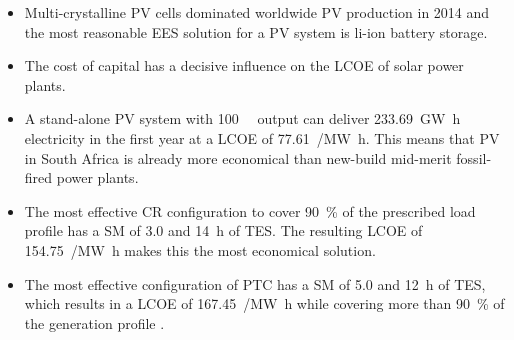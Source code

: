 \begin{itemize}
\item Multi-crystalline \ac{PV} cells dominated worldwide \ac{PV} production in 2014 and the most reasonable \ac{EES} solution for a PV system is \ac{li-ion} battery storage.

\item The cost of capital has a decisive influence on the \ac{LCOE} of solar power plants.


\item A stand-alone \ac{PV} system with \SI{100}{\mega\wattsac} output can deliver \SI{233.69}{\giga\watt\hour} electricity in the first year at a \ac{LCOE} of \SI{77.61}{\usd/\mega\watt\hour}. This means that \ac{PV} in South Africa is already more economical than new-build mid-merit fossil-fired power plants.


\item The most effective \ac{CR} configuration to cover \SI{90}{\percent} of the prescribed load profile has a \ac{SM} of \num{3.0} and \SI{14}{\hour} of \ac{TES}. The resulting \ac{LCOE} of \SI{154.75}{\usd/\mega\watt\hour} makes this the most economical solution.


\item The most effective configuration of \ac{PTC} has a \ac{SM} of \num{5.0} and \SI{12}{\hour} of \ac{TES}, which results in a \ac{LCOE} of \SI{167.45}{\usd/\mega\watt\hour} while covering more than \SI{90}{\percent} of the generation profile .


\end{itemize}
